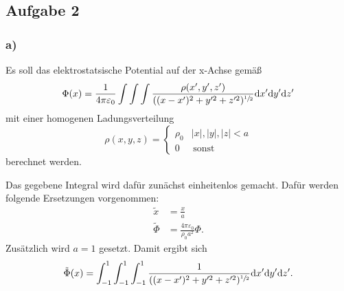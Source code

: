 \subsection*{Aufgabe 2}

\subsubsection*{a)}

Es soll das elektrostatsische Potential auf der x-Achse gemäß
\begin{equation}
  \Phi(x) = \frac{1}{4 \pi \varepsilon_0} \int \int \int \frac{\rho(x', y', z')}{((x-x')^2+y'^2+z'^2)^{\sfrac{1}{2}}} \mathrm{d}x'\mathrm{d}y'\mathrm{d}z'
  \label{eqn:phi}
\end{equation}
mit einer homogenen Ladungsverteilung
\begin{equation*}
  \rho(x, y, z) = \begin{cases}
  \rho_0 & |x|,|y|,|z| < a \\
  0 &\, \text{sonst}
\end{cases}
\end{equation*}
berechnet werden.

Das gegebene Integral wird dafür zunächst einheitenlos gemacht. Dafür werden folgende Ersetzungen vorgenommen:
\begin{align*}
    \tilde{x} &= \frac{x}{a} \\
    \tilde{\Phi} &= \frac{4 \pi \varepsilon_0}{\rho_0 a^2} \Phi.
\end{align*}
Zusätzlich wird \(a = 1\) gesetzt. Damit ergibt sich
\begin{equation*}
  \tilde{\Phi}(x) = \int_{-1}^1 \int_{-1}^1 \int_{-1}^1 \frac{1}{((x-x')^2+y'^2+z'^2)^{\sfrac{1}{2}}} \mathrm{d}x'\mathrm{d}y'\mathrm{d}z'.
\end{equation*}


